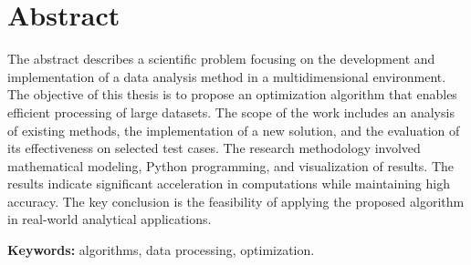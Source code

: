 \chapter*{Abstract}
The abstract describes a scientific problem focusing on the development and implementation of a data analysis method in a multidimensional environment.
The objective of this thesis is to propose an optimization algorithm that enables efficient processing of large datasets.
The scope of the work includes an analysis of existing methods, the implementation of a new solution, and the evaluation of its effectiveness on selected test cases.
The research methodology involved mathematical modeling, Python programming, and visualization of results.
The results indicate significant acceleration in computations while maintaining high accuracy.
The key conclusion is the feasibility of applying the proposed algorithm in real-world analytical applications.

\textbf{Keywords:} algorithms, data processing, optimization.
